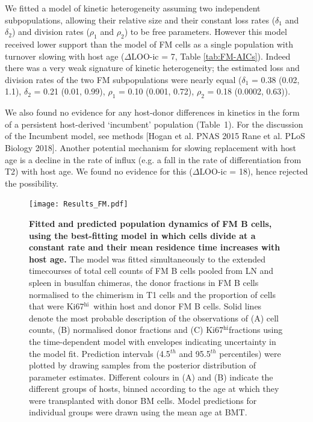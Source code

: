 \documentclass[11pt]{article}
\newcommand{\khi}{Ki67$^\text{hi}$}
\begin{document}
	We fitted a model of kinetic heterogeneity assuming two independent subpopulations, allowing their relative size and their constant loss rates ($\delta_{1}$ and $\delta_{2}$) and division rates ($\rho_{1}$ and $\rho_{2}$)  to be free parameters. However this model received lower support than the model of FM cells as a single population with turnover slowing with host age ($\Delta$LOO-ic = 7, Table \ref{tab:FM-AICs}).   Indeed there was a very weak signature of kinetic heterogeneity;  the estimated loss and division rates of the two FM subpopulations were nearly equal  ($\delta_{1}$ = 0.38 (0.02, 1.1), $\delta_{2}$ = 0.21 (0.01, 0.99), $\rho_{1}$ = 0.10 (0.001, 0.72), $\rho_{2}$ = 0.18 (0.0002, 0.63)). %
	
	We also found no evidence for any host-donor differences in kinetics in the form of a persistent host-derived `incumbent' population (Table~1). For the discussion of the Incumbent model, see methods [Hogan et al. PNAS 2015 Rane et al. PLoS Biology 2018].
	Another potential mechanism for slowing replacement with host age is a decline in the rate of influx (e.g. a fall in the rate of differentiation from T2) with host age. We found no evidence for this ($\Delta$LOO-ic = 18), hence rejected the possibility.
	
	\begin{figure}[h!]
		\centerline{\texttt{[image: Results\_FM.pdf]}}
		\caption{\small \textbf{Fitted and predicted   population dynamics of FM B cells, using the best-fitting model in which cells divide at a constant rate and their mean residence time increases with host age.}  The model was fitted simultaneously to the extended timecourses of total cell counts of FM B cells pooled from LN and spleen in busulfan chimeras, the donor fractions in FM B cells normalised to the chimerism in T1 cells and the proportion of cells that were \khi\ within host and donor FM B cells. Solid lines denote the most probable description of the observations of (A) cell counts, (B) normalised donor fractions and (C) \khi fractions using the time-dependent model with envelopes indicating uncertainty in the model fit. Prediction intervals (4.5$^{th}$ and 95.5$^{th}$ percentiles) were plotted by drawing samples from the posterior distribution of parameter estimates. Different colours in (A) and (B) indicate the different groups of hosts, binned according to the age at which they were transplanted with donor BM cells. Model predictions for individual groups were drawn using the mean age at BMT.}
		\label{fig:results_FM}
	\end{figure}
	
\end{document}
